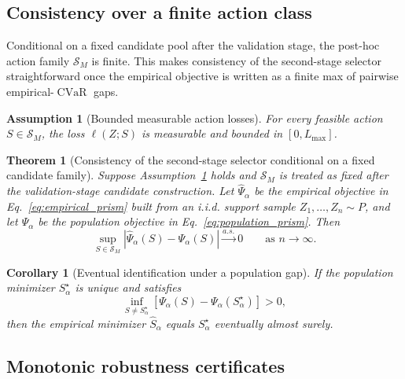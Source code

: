 \documentclass{article}
\newtheorem{theorem}{Theorem}
\newtheorem{corollary}{Corollary}
\newtheorem{assumption}{Assumption}
\newcommand{\cS}{\mathcal{S}}
\newcommand{\CVaR}{\operatorname{CVaR}}
\newcommand{\iid}{i.i.d.}
\newcommand{\bracks}[1]{\left[ #1 \right]}
\newcommand{\loss}{\ell}
\newcommand{\1}{\mathbbm{1}}
\begin{document}
\subsection{Consistency over a finite action class}

Conditional on a fixed candidate pool after the validation stage, the post-hoc action family \(\cS_M\) is finite. This makes consistency of the second-stage selector straightforward once the empirical objective is written as a finite max of pairwise empirical-\(\CVaR\) gaps.

\begin{assumption}[Bounded measurable action losses]
\label{ass:bounded_losses}
For every feasible action \(S\in\cS_M\), the loss \(\loss(Z;S)\) is measurable and bounded in \([0,L_{\max}]\).
\end{assumption}

\begin{theorem}[Consistency of the second-stage selector conditional on a fixed candidate family]
\label{thm:consistency}
Suppose Assumption~\ref{ass:bounded_losses} holds and \(\cS_M\) is treated as fixed after the validation-stage candidate construction. Let \(\widehat{\Psi}_\alpha\) be the empirical objective in Eq.~\eqref{eq:empirical_prism} built from an \iid{} support sample \(Z_1,\ldots,Z_n \sim P\), and let \(\Psi_\alpha\) be the population objective in Eq.~\eqref{eq:population_prism}. Then
\begin{equation}
    \sup_{S\in\cS_M}
    \left|
        \widehat{\Psi}_\alpha(S) - \Psi_\alpha(S)
    \right|
    \xrightarrow[]{a.s.} 0
    \qquad \text{as } n\to\infty.
    \label{eq:uniform_consistency}
\end{equation}
\end{theorem}

\begin{corollary}[Eventual identification under a population gap]
\label{cor:identification}
If the population minimizer \(S_\alpha^\star\) is unique and satisfies
\begin{equation}
    \inf_{S\neq S_\alpha^\star}
    \bracks{
        \Psi_\alpha(S) - \Psi_\alpha(S_\alpha^\star)
    }
    > 0,
    \label{eq:population_gap}
\end{equation}
then the empirical minimizer \(\widehat{S}_\alpha\) equals \(S_\alpha^\star\) eventually almost surely.
\end{corollary}

\subsection{Monotonic robustness certificates}
\end{document}

